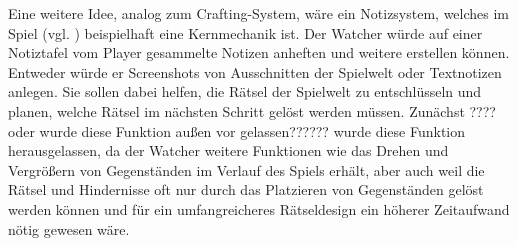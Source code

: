 Eine weitere Idee, analog zum Crafting-System, wäre ein Notizsystem, welches im Spiel  (vgl. \cite{colepowered_games_shadows_nodate}) beispielhaft eine Kernmechanik ist. Der Watcher würde auf einer Notiztafel vom Player gesammelte Notizen anheften und weitere erstellen können. Entweder würde er Screenshots von Ausschnitten der Spielwelt oder Textnotizen anlegen. Sie sollen dabei helfen, die Rätsel der Spielwelt zu entschlüsseln und planen, welche Rätsel im nächsten Schritt gelöst werden müssen. Zunächst ????oder wurde diese Funktion außen vor gelassen?????? wurde diese Funktion herausgelassen, da der Watcher weitere Funktionen wie das Drehen und Vergrößern von Gegenständen im Verlauf des Spiels erhält, aber auch weil die Rätsel und Hindernisse oft nur durch das Platzieren von Gegenständen gelöst werden können und für ein umfangreicheres Rätseldesign ein höherer Zeitaufwand nötig gewesen wäre.












